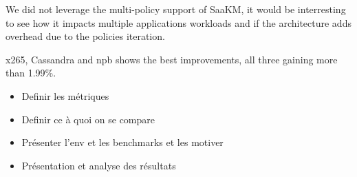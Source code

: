 \par We did not leverage the multi-policy support of SaaKM, it would be interresting to see how it impacts multiple applications workloads and if the architecture adds overhead due to the policies iteration. \newline

\par x265, Cassandra and npb shows the best improvements, all three gaining more than 1.99\%. 
\begin{itemize}
        \item Definir les métriques
        \item Definir ce à quoi on se compare
        \item Présenter l'env et les benchmarks et les motiver
        \item Présentation et analyse des résultats
\end{itemize} 


